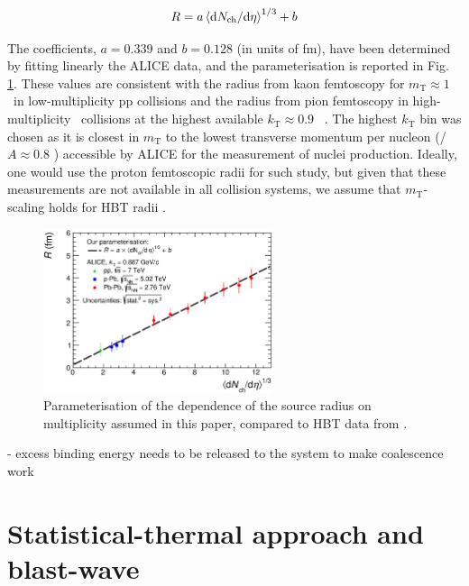 \documentclass[a4paper,11pt]{scrartcl} %
\begin{document}
\begin{equation}
R = a \left<\mathrm{d}N_\mathrm{ch}/\mathrm{d}\eta\right>^{1/3} + b
\label{eq:radiusParameterisation}
\end{equation}

The coefficients, $a = 0.339$ and $b = 0.128$ (in units of fm), have been determined by fitting linearly the ALICE data, and the parameterisation is reported in Fig. \ref{fig:radiiparam}. 
These values are consistent with the radius from kaon femtoscopy for $m_{\mathrm{T}} \approx 1$ \GeVc~in low-multiplicity pp collisions \cite{Abelev:2012sq} and the radius from pion femtoscopy in high-multiplicity \PbPb~collisions at the highest available $k_{\mathrm{T}} \approx 0.9$ \GeVc~\cite{Adam:2015vna}. 
The highest $k_{\mathrm{T}}$ bin was chosen as it is closest in $m_{\mathrm{T}}$ to the lowest transverse momentum per nucleon (\pt/$A \approx 0.8$ \GeVc) accessible by ALICE for the measurement of nuclei production. 
Ideally, one would use the proton femtoscopic radii for such study, but given that these measurements are not  available in all collision systems, we assume that $m_{\mathrm{T}}$-scaling holds for HBT radii \cite{Adam:2015vja}.

\begin{figure}[htbp]
\begin{center}
\includegraphics[width=0.6\textwidth]{HbtRadiusParam.eps}
\caption{Parameterisation of the dependence of the source radius on multiplicity assumed in this paper, compared to HBT data from \cite{Adam:2015vna, Abelev:2012sq}.}
\label{fig:radiiparam}
\end{center}
\end{figure}


- excess binding energy needs to be released to the system to make coalescence work


\section{Statistical-thermal approach and blast-wave}\label{sec:thermal}
\end{document}
